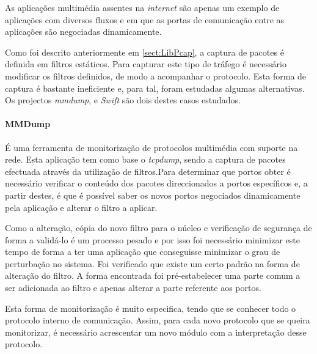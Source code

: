 As aplicações multimédia assentes na \textit{internet} são apenas um exemplo de aplicações com diversos fluxos e em que as portas de comunicação entre as aplicações são negociadas dinamicamente.

Como foi descrito anteriormente em \ref{sect:LibPcap}, a captura de pacotes é definida em filtros estáticos. Para capturar este tipo de tráfego é necessário modificar os filtros definidos, de modo a acompanhar o protocolo. Esta forma de captura é bastante ineficiente e, para tal, foram estudadas algumas alternativas. Os projectos \textit{mmdump}\cite{505678}, %
e \textit{Swift}\cite{1387609} são dois destes casos estudados.

\paragraph*{MMDump} É uma ferramenta de monitorização de protocolos multimédia com suporte na rede. Esta aplicação tem como base o \textit{tcpdump}, sendo a captura de pacotes efectuada através da utilização de filtros.Para determinar que portos obter é necessário verificar o conteúdo dos pacotes direccionados a portos específicos e, a partir destes, é que é possível saber os novos portos negociados dinamicamente pela aplicação e alterar o filtro a aplicar. 

Como a alteração, cópia do novo filtro para o núcleo e verificação de segurança de forma a validá-lo é um processo pesado e por isso foi necessário minimizar este tempo de forma a ter uma aplicação que conseguisse minimizar o grau de perturbação no sistema. Foi verificado que existe um certo padrão na forma de alteração do filtro. A forma encontrada foi pré-estabelecer uma parte comum a ser adicionada ao filtro e apenas alterar a parte referente aos portos.

Esta forma de monitorização é muito especifica, tendo que se conhecer todo o protocolo interno de comunicação. Assim, para cada novo protocolo que se queira monitorizar, é necessário acrescentar um novo módulo com a interpretação desse protocolo.


